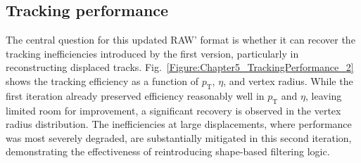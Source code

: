 \subsection{Tracking performance}

The central question for this updated RAW' format is whether it can recover the tracking inefficiencies introduced by the first version, particularly in reconstructing displaced tracks. Fig.~\ref{Figure:Chapter5_TrackingPerformance_2} shows the tracking efficiency as a function of $p_\mathrm{T}$, $\eta$, and vertex radius. While the first iteration already preserved efficiency reasonably well in $p_\mathrm{T}$ and $\eta$, leaving limited room for improvement, a significant recovery is observed in the vertex radius distribution. The inefficiencies at large displacements, where performance was most severely degraded, are substantially mitigated in this second iteration, demonstrating the effectiveness of reintroducing shape-based filtering logic.

